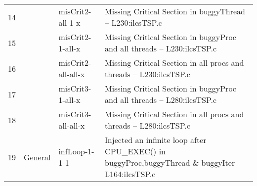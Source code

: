 \begin{table*}[t]
{\begin{tabular}{|c|c|l|l|}
14 &  & misCrit2-all-1-x & Missing Critical Section in buggyThread -- L230:ilcsTSP.c \\ \cline{1-1} \cline{3-4} 
15 &  & misCrit2-1-all-x & Missing Critical Section in buggyProc and all threads -- L230:ilcsTSP.c \\ \cline{1-1} \cline{3-4} 
16 &  & misCrit2-all-all-x & Missing Critical Section in all procs and threads -- L230:ilcsTSP.c \\ \cline{1-1} \cline{3-4} 
17 &  & misCrit3-1-all-x & Missing Critical Section in buggyProc and all threads -- L280:ilcsTSP.c \\ \cline{1-1} \cline{3-4} 
18 &  & misCrit3-all-all-x & Missing Critical Section in all procs and threads -- L280:ilcsTSP.c \\ \hline
19 & General & infLoop-1-1-1 & Injected an infinite loop after CPU\_EXEC() in buggyProc,buggyThread \& buggyIter L164:ilcsTSP.c \\ \hline
\end{tabular}
}
\end{table*}